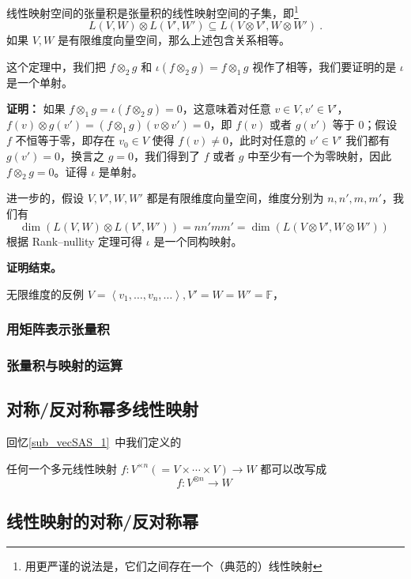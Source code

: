 \begin{theorem}{}
线性映射空间的张量积是张量积的线性映射空间的子集，即\footnote{用更严谨的说法是，它们之间存在一个（典范的）线性映射}
\begin{equation}
L(V, W) \otimes L(V', W') \subseteq L(V \otimes V', W \otimes W')~.
\end{equation}
如果 $V, W$ 是有限维度向量空间，那么上述包含关系相等。
\end{theorem}

这个定理中，我们把 $f \otimes_2 g$ 和 $\iota(f \otimes_2 g) = f \otimes_1 g$ 视作了相等，我们要证明的是 $\iota$ 是一个单射。

\textbf{证明：}
如果 $f \otimes_1 g = \iota(f \otimes_2 g) = 0$，这意味着对任意 $v \in V, v' \in V'$，$f(v) \otimes g(v') = (f \otimes_1 g)(v \otimes v') = 0$，即 $f(v)$ 或者 $g(v')$ 等于 $0$；假设 $f$ 不恒等于零，即存在 $v_0 \in V$ 使得 $f(v) \neq 0$，此时对任意的 $v' \in V'$ 我们都有 $g(v') = 0$，换言之 $g = 0$，我们得到了 $f$ 或者 $g$ 中至少有一个为零映射，因此 $f \otimes_2 g = 0$。证得 $\iota$ 是单射。

进一步的，假设 $V, V', W, W'$ 都是有限维度向量空间，维度分别为 $n, n', m, m'$，我们有
\begin{equation}
\dim(L(V, W) \otimes L(V', W')) = n n' m m' = \dim(L(V \otimes V', W \otimes W'))~
\end{equation}
根据 Rank–nullity 定理可得 $\iota$ 是一个同构映射。

\textbf{证明结束。}

\begin{example}{无限维度的反例}
$V = \left\langle v_1, \dots, v_n, \dots \right\rangle, V' = W = W' = \mathbb{F}$，
\end{example}





\subsubsection{用矩阵表示张量积}


\subsubsection{张量积与映射的运算}



\subsection{对称/反对称幂多线性映射}


回忆\autoref{sub_vecSAS_1}~中我们定义的

任何一个多元线性映射 $f: V^{\times n} (= V \times \cdots \times V) \to W$ 都可以改写成
\begin{equation}
f: V^{\otimes n} \to W~
\end{equation}

\subsection{线性映射的对称/反对称幂}




